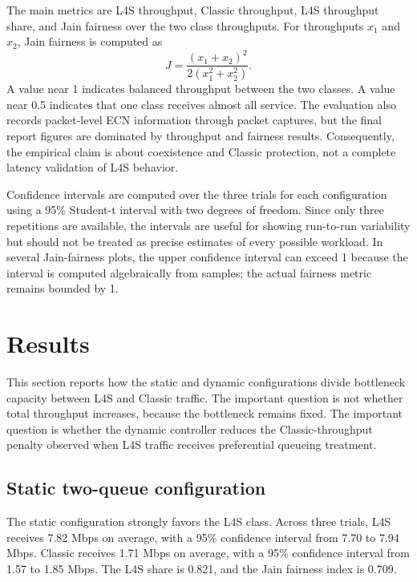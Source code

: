 \documentclass[10pt]{article}
\begin{document}
The main metrics are L4S throughput, Classic throughput, L4S throughput share, and Jain fairness over the two class throughputs. For throughputs $x_1$ and $x_2$, Jain fairness is computed as
\begin{equation}
J = \frac{(x_1 + x_2)^2}{2(x_1^2 + x_2^2)}.
\end{equation}
A value near 1 indicates balanced throughput between the two classes. A value near 0.5 indicates that one class receives almost all service. The evaluation also records packet-level ECN information through packet captures, but the final report figures are dominated by throughput and fairness results. Consequently, the empirical claim is about coexistence and Classic protection, not a complete latency validation of L4S behavior.

Confidence intervals are computed over the three trials for each configuration using a 95\% Student-t interval with two degrees of freedom. Since only three repetitions are available, the intervals are useful for showing run-to-run variability but should not be treated as precise estimates of every possible workload. In several Jain-fairness plots, the upper confidence interval can exceed 1 because the interval is computed algebraically from samples; the actual fairness metric remains bounded by 1.

\section{Results}

This section reports how the static and dynamic configurations divide bottleneck capacity between L4S and Classic traffic. The important question is not whether total throughput increases, because the bottleneck remains fixed. The important question is whether the dynamic controller reduces the Classic-throughput penalty observed when L4S traffic receives preferential queueing treatment.

\subsection{Static two-queue configuration}

The static configuration strongly favors the L4S class. Across three trials, L4S receives 7.82 Mbps on average, with a 95\% confidence interval from 7.70 to 7.94 Mbps. Classic receives 1.71 Mbps on average, with a 95\% confidence interval from 1.57 to 1.85 Mbps. The L4S share is 0.821, and the Jain fairness index is 0.709.
\end{document}
